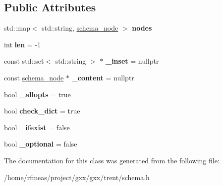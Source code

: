 \subsection*{Public Attributes}
\begin{DoxyCompactItemize}
\item 
std\+::map$<$ std\+::string, \hyperlink{classgxx_1_1schema_1_1schema__node}{schema\+\_\+node} $>$ {\bfseries nodes}\hypertarget{classgxx_1_1schema_1_1schema__node_aca34f5895a00a00319ee58f9fb3a40e9}{}\label{classgxx_1_1schema_1_1schema__node_aca34f5895a00a00319ee58f9fb3a40e9}

\item 
int {\bfseries len} = -\/1\hypertarget{classgxx_1_1schema_1_1schema__node_a2228ae13084733e4db1d90fc09dc4b5c}{}\label{classgxx_1_1schema_1_1schema__node_a2228ae13084733e4db1d90fc09dc4b5c}

\item 
const std\+::set$<$ std\+::string $>$ $\ast$ {\bfseries \+\_\+inset} = nullptr\hypertarget{classgxx_1_1schema_1_1schema__node_ae68fe62ecc04aa1dbee1a8540637b1c4}{}\label{classgxx_1_1schema_1_1schema__node_ae68fe62ecc04aa1dbee1a8540637b1c4}

\item 
const \hyperlink{classgxx_1_1schema_1_1schema__node}{schema\+\_\+node} $\ast$ {\bfseries \+\_\+content} = nullptr\hypertarget{classgxx_1_1schema_1_1schema__node_ad48ebf5793278c2baef6896083f0b4af}{}\label{classgxx_1_1schema_1_1schema__node_ad48ebf5793278c2baef6896083f0b4af}

\item 
bool {\bfseries \+\_\+allopts} = true\hypertarget{classgxx_1_1schema_1_1schema__node_a40eb37a5b1addccd1cfcaf4128f3a976}{}\label{classgxx_1_1schema_1_1schema__node_a40eb37a5b1addccd1cfcaf4128f3a976}

\item 
bool {\bfseries check\+\_\+dict} = true\hypertarget{classgxx_1_1schema_1_1schema__node_a86f481d850923a215c2a486ff4f0e49f}{}\label{classgxx_1_1schema_1_1schema__node_a86f481d850923a215c2a486ff4f0e49f}

\item 
bool {\bfseries \+\_\+ifexist} = false\hypertarget{classgxx_1_1schema_1_1schema__node_aa82855bd2a7f48ad0544dfc4532d5469}{}\label{classgxx_1_1schema_1_1schema__node_aa82855bd2a7f48ad0544dfc4532d5469}

\item 
bool {\bfseries \+\_\+optional} = false\hypertarget{classgxx_1_1schema_1_1schema__node_a316159f16a5bb9e0de7352fe5f193db1}{}\label{classgxx_1_1schema_1_1schema__node_a316159f16a5bb9e0de7352fe5f193db1}

\end{DoxyCompactItemize}


The documentation for this class was generated from the following file\+:\begin{DoxyCompactItemize}
\item 
/home/rfmeas/project/gxx/gxx/trent/schema.\+h\end{DoxyCompactItemize}
